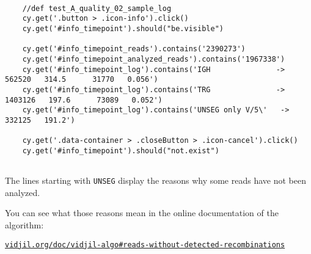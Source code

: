 \begin{verbatim}

    //def test_A_quality_02_sample_log
    cy.get('.button > .icon-info').click()
    cy.get('#info_timepoint').should("be.visible")

    cy.get('#info_timepoint_reads').contains('2390273')
    cy.get('#info_timepoint_analyzed_reads').contains('1967338')
    cy.get('#info_timepoint_log').contains('IGH               ->   562520   314.5      31770   0.056')
    cy.get('#info_timepoint_log').contains('TRG               ->  1403126   197.6      73089   0.052')
    cy.get('#info_timepoint_log').contains('UNSEG only V/5\'   ->   332125   191.2')

    cy.get('.data-container > .closeButton > .icon-cancel').click()
    cy.get('#info_timepoint').should("not.exist")


\end{verbatim}

The lines starting with \texttt{UNSEG} display the reasons why some reads have
not been analyzed.

You can see what those reasons mean in the online documentation of the
algorithm:

 \centerline{\tt\href{http://www.vidjil.org/doc/vidjil-algo/\#reads-without-detected-recombinations}{vidjil.org/doc/vidjil-algo\#reads-without-detected-recombinations}}



